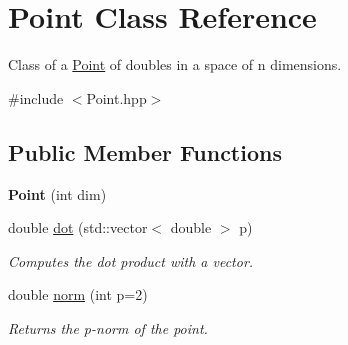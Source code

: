 \hypertarget{class_point}{}\section{Point Class Reference}
\label{class_point}


Class of a \hyperlink{class_point}{Point} of doubles in a space of n dimensions.  




{\ttfamily \#include $<$Point.\+hpp$>$}

\subsection*{Public Member Functions}
\begin{DoxyCompactItemize}
\item 
\mbox{\label{class_point_a82e69bcefbcbc72eac5c1acd88784aef}} 
{\bfseries Point} (int dim)
\item 
double \hyperlink{class_point_a9d8da6733d7e4110a62e8d0f82676761}{dot} (std\+::vector$<$ double $>$ p)
\begin{DoxyCompactList}\small\item\em Computes the dot product with a vector. \end{DoxyCompactList}\item 
double \hyperlink{class_point_aab64e3f0a9eecba00a1607eb4c7768c3}{norm} (int p=2)
\begin{DoxyCompactList}\small\item\em Returns the p-\/norm of the point. \end{DoxyCompactList}\end{DoxyCompactItemize}
